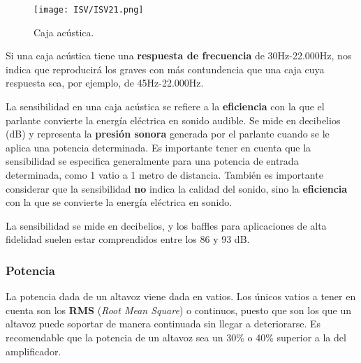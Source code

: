 \documentclass[
	12pt, %
	fleqn, %
	a4paper, %
	oneside, %
]{LegrandOrangeBook}
\begin{document}
\begin{figure}[H]
\centering
\texttt{[image: ISV/ISV21.png]}
\caption{Caja acústica.}
\end{figure}
\begin{notation}
Si una caja acústica tiene una \textbf{respuesta de frecuencia} de 30Hz-22.000Hz, nos indica que reproducirá los graves con más contundencia que una caja cuya respuesta sea, por ejemplo, de 45Hz-22.000Hz.
\end{notation}
\begin{definition}[Sensibilidad]
La sensibilidad en una caja acústica se refiere a la \textbf{eficiencia} con la que el parlante convierte la energía eléctrica en sonido audible. Se mide en decibelios (dB) y representa la \textbf{presión sonora} generada por el parlante cuando se le aplica una potencia determinada. Es importante tener en cuenta que la sensibilidad se especifica generalmente para una potencia de entrada determinada, como 1 vatio a 1 metro de distancia. También es importante considerar que la sensibilidad \textbf{no} indica la calidad del sonido, sino la \textbf{eficiencia} con la que se convierte la energía eléctrica en sonido.
\end{definition}
\begin{notation}
La sensibilidad se  mide en decibelios, y los baffles para aplicaciones de alta fidelidad suelen estar comprendidos entre los 86 y 93 dB. 
\end{notation}
\subsubsection{Potencia}
La potencia dada de un altavoz viene dada en vatios. Los únicos vatios a tener en cuenta son los \textbf{RMS} (\textit{Root Mean Square}) o continuos, puesto que son los que un altavoz puede soportar de manera continuada sin llegar a deteriorarse. Es recomendable que la potencia de un altavoz sea un 30\% o 40\% superior a la del amplificador. 
\end{document}
